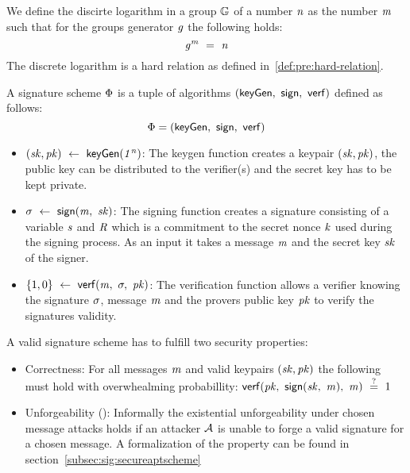 \begin{definition}\label{def:pre:discretelog}
    We define the discirte logarithm in a group $\mathbb{G}$ of a number $\mathit{n}$ as the number $\mathit{m}$ such that for the groups generator $\mathit{g}$ the following holds:
    \[ \mathit{g}^{\mathit{m}} ~=~ \mathit{n} \]
    The discrete logarithm is a hard relation as defined in~\ref{def:pre:hard-relation}.
\end{definition}

\begin{definition}\label{def:pre:signature-scheme}
    A signature scheme $\Phi$ is a tuple of algorithms $(\mathsf{keyGen} ,~ \mathsf{sign} ,~ \mathsf{verf})$ defined as follows: \cite{goldwasser1988digital}
    \[ \Phi = (\mathsf{keyGen} ,~ \mathsf{sign} ,~ \mathsf{verf}) \]

    \begin{itemize}
        \item $(\mathit{sk}, \mathit{pk}) ~\leftarrow~ \mathsf{keyGen}(\mathit{1^n})$: The keygen function creates a keypair $(\mathit{sk}, \mathit{pk})$, the public key can be distributed to the verifier(s) and the secret key has to be kept private. \\
        \item $\sigma ~\leftarrow~ \mathsf{sign}(\mathit{m} ,~ \mathit{sk})$: The signing function creates a signature consisting of a variable $\mathit{s}$ and $\mathit{R}$ which is a commitment to the secret nonce $\mathit{k}$ used during the signing process.
        As an input it takes a message $\mathit{m}$ and the secret key $\mathit{sk}$ of the signer.
        \item $\{1,0\} ~\leftarrow~ \mathsf{verf}(\mathit{m} ,~ \sigma ,~ \mathit{pk})$: The verification function allows a verifier knowing the signature $\sigma$, message $\mathit{m}$ and the provers public key $\mathit{pk}$ to verify the signatures
        validity. \\
    \end{itemize}

    A valid signature scheme has to fulfill two security properties:
    \begin{itemize}
        \item Correctness: For all messages $\mathit{m}$ and valid keypairs $(\mathit{sk}, \mathit{pk})$ the following must hold with overwhealming probabillity: $\mathsf{verf}(\mathit{pk} ,~ \mathsf{sign}(\mathit{sk} ,~ \mathit{m}) ,~ \mathit{m}) ~\stackrel{?}{=}~ 1$
        \item Unforgeability (\cnstEUFCMA): Informally the existential unforgeability under chosen message attacks holds if an attacker $\mathcal{A}$ is unable to forge a valid signature for a chosen message.
        A formalization of the property can be found in section~\ref{subsec:sig:secureaptscheme}
    \end{itemize}
\end{definition}

